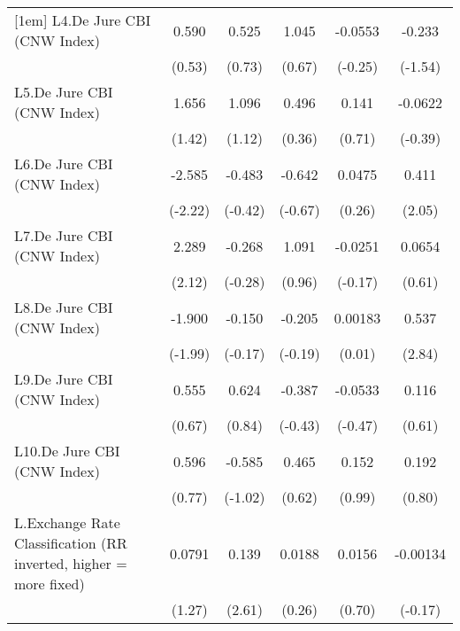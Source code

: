 {\begin{tabular*}{\linewidth}{@{\hskip\tabcolsep\extracolsep\fill}l*{5}{c}}
[1em]
L4.De Jure CBI (CNW Index)&    0.590         &    0.525         &    1.045         &  -0.0553         &   -0.233         \\
                &   (0.53)         &   (0.73)         &   (0.67)         &  (-0.25)         &  (-1.54)         \\
[1em]
L5.De Jure CBI (CNW Index)&    1.656         &    1.096         &    0.496         &    0.141         &  -0.0622         \\
                &   (1.42)         &   (1.12)         &   (0.36)         &   (0.71)         &  (-0.39)         \\
[1em]
L6.De Jure CBI (CNW Index)&   -2.585\sym{*}  &   -0.483         &   -0.642         &   0.0475         &    0.411\sym{*}  \\
                &  (-2.22)         &  (-0.42)         &  (-0.67)         &   (0.26)         &   (2.05)         \\
[1em]
L7.De Jure CBI (CNW Index)&    2.289\sym{*}  &   -0.268         &    1.091         &  -0.0251         &   0.0654         \\
                &   (2.12)         &  (-0.28)         &   (0.96)         &  (-0.17)         &   (0.61)         \\
[1em]
L8.De Jure CBI (CNW Index)&   -1.900\sym{*}  &   -0.150         &   -0.205         &  0.00183         &    0.537\sym{**} \\
                &  (-1.99)         &  (-0.17)         &  (-0.19)         &   (0.01)         &   (2.84)         \\
[1em]
L9.De Jure CBI (CNW Index)&    0.555         &    0.624         &   -0.387         &  -0.0533         &    0.116         \\
                &   (0.67)         &   (0.84)         &  (-0.43)         &  (-0.47)         &   (0.61)         \\
[1em]
L10.De Jure CBI (CNW Index)&    0.596         &   -0.585         &    0.465         &    0.152         &    0.192         \\
                &   (0.77)         &  (-1.02)         &   (0.62)         &   (0.99)         &   (0.80)         \\
[1em]
L.Exchange Rate Classification (RR inverted, higher = more fixed)&   0.0791         &    0.139\sym{*}  &   0.0188         &   0.0156         & -0.00134         \\
                &   (1.27)         &   (2.61)         &   (0.26)         &   (0.70)         &  (-0.17)         \\

\end{tabular*}}
